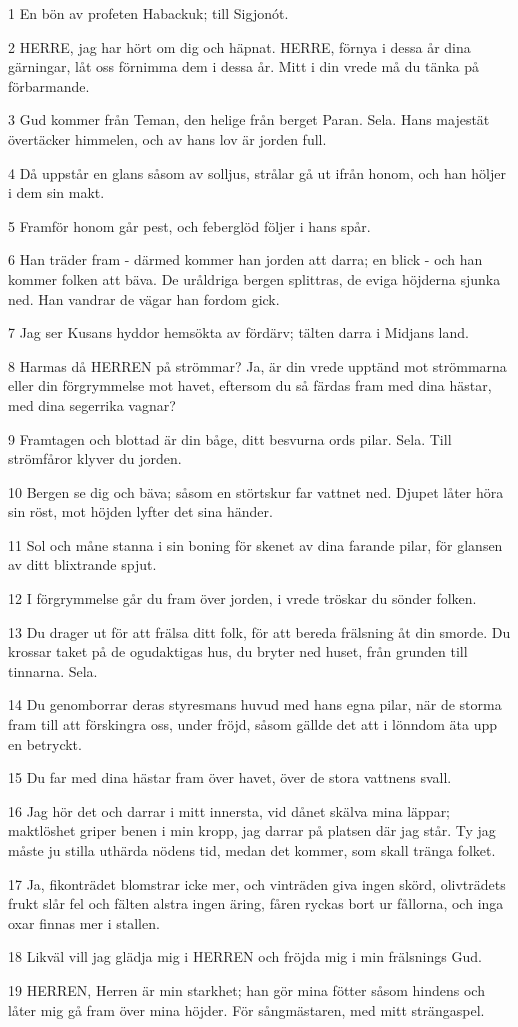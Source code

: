 \par 1 En bön av profeten Habackuk; till Sigjonót.
\par 2 HERRE, jag har hört om dig och häpnat. HERRE, förnya i dessa år dina gärningar, låt oss förnimma dem i dessa år. Mitt i din vrede må du tänka på förbarmande.
\par 3 Gud kommer från Teman, den helige från berget Paran. Sela. Hans majestät övertäcker himmelen, och av hans lov är jorden full.
\par 4 Då uppstår en glans såsom av solljus, strålar gå ut ifrån honom, och han höljer i dem sin makt.
\par 5 Framför honom går pest, och feberglöd följer i hans spår.
\par 6 Han träder fram - därmed kommer han jorden att darra; en blick - och han kommer folken att bäva. De uråldriga bergen splittras, de eviga höjderna sjunka ned. Han vandrar de vägar han fordom gick.
\par 7 Jag ser Kusans hyddor hemsökta av fördärv; tälten darra i Midjans land.
\par 8 Harmas då HERREN på strömmar? Ja, är din vrede upptänd mot strömmarna eller din förgrymmelse mot havet, eftersom du så färdas fram med dina hästar, med dina segerrika vagnar?
\par 9 Framtagen och blottad är din båge, ditt besvurna ords pilar. Sela. Till strömfåror klyver du jorden.
\par 10 Bergen se dig och bäva; såsom en störtskur far vattnet ned. Djupet låter höra sin röst, mot höjden lyfter det sina händer.
\par 11 Sol och måne stanna i sin boning för skenet av dina farande pilar, för glansen av ditt blixtrande spjut.
\par 12 I förgrymmelse går du fram över jorden, i vrede tröskar du sönder folken.
\par 13 Du drager ut för att frälsa ditt folk, för att bereda frälsning åt din smorde. Du krossar taket på de ogudaktigas hus, du bryter ned huset, från grunden till tinnarna. Sela.
\par 14 Du genomborrar deras styresmans huvud med hans egna pilar, när de storma fram till att förskingra oss, under fröjd, såsom gällde det att i lönndom äta upp en betryckt.
\par 15 Du far med dina hästar fram över havet, över de stora vattnens svall.
\par 16 Jag hör det och darrar i mitt innersta, vid dånet skälva mina läppar; maktlöshet griper benen i min kropp, jag darrar på platsen där jag står. Ty jag måste ju stilla uthärda nödens tid, medan det kommer, som skall tränga folket.
\par 17 Ja, fikonträdet blomstrar icke mer, och vinträden giva ingen skörd, olivträdets frukt slår fel och fälten alstra ingen äring, fåren ryckas bort ur fållorna, och inga oxar finnas mer i stallen.
\par 18 Likväl vill jag glädja mig i HERREN och fröjda mig i min frälsnings Gud.
\par 19 HERREN, Herren är min starkhet; han gör mina fötter såsom hindens och låter mig gå fram över mina höjder. För sångmästaren, med mitt strängaspel.


